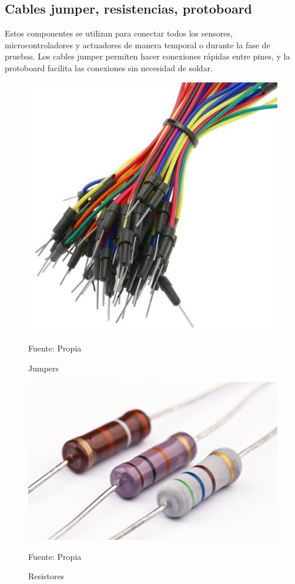 \subsection{Cables jumper, resistencias, protoboard}

Estos componentes se utilizan para conectar todos los sensores, microcontroladores y actuadores de manera temporal o durante la fase de pruebas. Los cables jumper permiten hacer conexiones rápidas entre pines, y la protoboard facilita las conexiones sin necesidad de soldar.

\begin{figure}[htb]
	\centering
	\includegraphics[scale  = 0.50]{Imagenes/jumper.jpg}
	\caption{Jumpers}{Fuente: Propia}
\end{figure}

\begin{figure}[htb]
	\centering
	\includegraphics[scale  = 0.50]{Imagenes/resistores.jpg}
	\caption{Resistores}{Fuente: Propia}
\end{figure}

